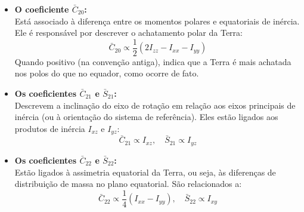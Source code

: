 \begin{itemize}
   \item \textbf{O coeficiente \( \bar{C}_{20} \):} \\
   Está associado à diferença entre os momentos polares e equatoriais de inércia. Ele é responsável por descrever o achatamento polar da Terra:
   \[
   \bar{C}_{20} \propto \frac{1}{2} \left( 2I_{zz} - I_{xx} - I_{yy} \right)
   \]
   Quando positivo (na convenção antiga), indica que a Terra é mais achatada nos polos do que no equador, como ocorre de fato.

   \item \textbf{Os coeficientes \( \bar{C}_{21} \) e \( \bar{S}_{21} \):} \\
   Descrevem a inclinação do eixo de rotação em relação aos eixos principais de inércia (ou à orientação do sistema de referência). Eles estão ligados aos produtos de inércia \( I_{xz} \) e \( I_{yz} \):
   \[
   \bar{C}_{21} \propto I_{xz}, \quad \bar{S}_{21} \propto I_{yz}
   \]

   \item \textbf{Os coeficientes \( \bar{C}_{22} \) e \( \bar{S}_{22} \):} \\
   Estão ligados à assimetria equatorial da Terra, ou seja, às diferenças de distribuição de massa no plano equatorial. São relacionados a:
   \[
   \bar{C}_{22} \propto \frac{1}{4}(I_{xx} - I_{yy}), \quad \bar{S}_{22} \propto I_{xy}
   \]
\end{itemize}







